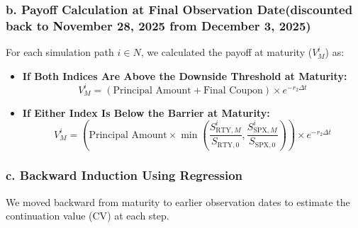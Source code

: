 \documentclass[12pt,a4paper]{article}
\begin{document}
\subsubsection*{b. Payoff Calculation at Final Observation Date(discounted back to November 28, 2025 from December 3, 2025)}

For each simulation path $i \in N$, we calculated the payoff at maturity (\( V_M^{i} \)) as:

\begin{itemize}
    \item \textbf{If Both Indices Are Above the Downside Threshold at Maturity:}
    \[
    V_M^{i} = ( \text{Principal Amount} + \text{Final Coupon} ) \times e^{-r_2 \Delta t}
    \]
    \item \textbf{If Either Index Is Below the Barrier at Maturity:}
    \[
    V_M^{i} = \left( \text{Principal Amount} \times \min\left( \frac{S_{\text{RTY},M}^{i}}{S_{\text{RTY},0}}, \frac{S_{\text{SPX},M}^{i}}{S_{\text{SPX},0}} \right) \right) \times e^{-r_2 \Delta t}
    \]
\end{itemize}

\subsubsection*{c. Backward Induction Using Regression}

We moved backward from maturity to earlier observation dates to estimate the continuation value (\( \text{CV} \)) at each step.
\end{document}

